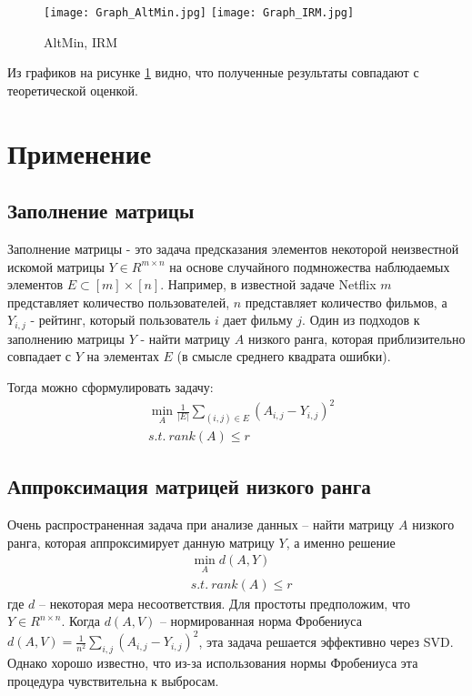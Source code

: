 \documentclass[oneside,final,14pt]{extreport} %
\begin{document}
\begin{figure}
	\centering
    \texttt{[image: Graph\_AltMin.jpg]}
    \texttt{[image: Graph\_IRM.jpg]}
    \caption{\label{est} AltMin, IRM}
  \end{figure}

Из графиков на рисунке \ref{est} видно, что полученные результаты совпадают с теоретической оценкой.

\chapter{Применение}

\section{Заполнение матрицы}
Заполнение матрицы - это задача предсказания элементов некоторой неизвестной искомой матрицы $Y \in R^{m \times n}$ на основе случайного подмножества наблюдаемых элементов $E \subset [m] \times [n]$. Например, в известной задаче Netflix $m$ представляет количество пользователей, $n$ представляет количество фильмов, а $Y_{i, j}$ - рейтинг, который пользователь $i$ дает фильму $j$. Один из подходов к заполнению матрицы $Y$ - найти матрицу $A$ низкого ранга, которая приблизительно совпадает с $Y$ на элементах $E$ (в смысле среднего квадрата ошибки).

Тогда можно сформулировать задачу:
\begin{equation}
	\begin{aligned}
		&\min_A \frac{1}{|E|} \sum_{(i,j) \in E} (A_{i, j} - Y_{i,j})^2 \\
		& s.t. \ rank(A) \le r
	\end{aligned}
\end{equation}

\section{Аппроксимация матрицей низкого ранга}
Очень распространенная задача при анализе данных -- найти матрицу $A$ низкого ранга, которая аппроксимирует данную матрицу $Y$, а именно решение 
\begin{equation}
	\begin{aligned}
		& \min_A d(A, Y) \\ 
		& s.t. \ rank (A) \le r
  	\end{aligned}
\end{equation}
где $d$ -- некоторая мера несоответствия. Для простоты предположим, что $Y \in R^{n \times n}$. Когда $d (A, V)$ -- нормированная норма Фробениуса $d (A, V) = \frac{1}{n^2} \sum_{i, j} (A_{i,j} - Y_{i,j})^2$, эта задача решается эффективно через SVD. Однако хорошо известно, что из-за использования нормы Фробениуса эта процедура чувствительна к выбросам.
\end{document}
